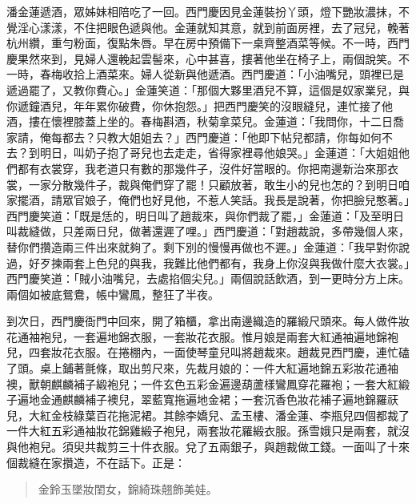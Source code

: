 潘金蓮遞酒，眾姊妹相陪吃了一回。西門慶因見金蓮裝扮丫頭，燈下艷妝濃抹，不覺淫心漾漾，不住把眼色遞與他。金蓮就知其意，就到前面房裡，去了冠兒，輓著杭州纘，重勻粉面，復點朱唇。早在房中預備下一桌齊整酒菜等候。不一時，西門慶果然來到，見婦人還輓起雲髻來，心中甚喜，摟著他坐在椅子上，兩個說笑。不一時，春梅收拾上酒菜來。婦人從新與他遞酒。西門慶道：「小油嘴兒，頭裡已是遞過罷了，又教你費心。」金蓮笑道：「那個大夥里酒兒不算，這個是奴家業兒，與你遞鐘酒兒，年年累你破費，你休抱怨。」把西門慶笑的沒眼縫兒，連忙接了他酒，摟在懷裡膝蓋上坐的。春梅斟酒，秋菊拿菜兒。金蓮道：「我問你，十二日喬家請，俺每都去？只教大姐姐去？」西門慶道：「他即下帖兒都請，你每如何不去？到明日，叫奶子抱了哥兒也去走走，省得家裡尋他娘哭。」金蓮道：「大姐姐他們都有衣裳穿，我老道只有數的那幾件子，沒件好當眼的。你把南邊新治來那衣裳，一家分散幾件子，裁與俺們穿了罷！只顧放著，敢生小的兒也怎的？到明日咱家擺酒，請眾官娘子，俺們也好見他，不惹人笑話。我長是說著，你把臉兒憨著。」西門慶笑道：「既是恁的，明日叫了趙裁來，與你們裁了罷，」金蓮道：「及至明日叫裁縫做，只差兩日兒，做著還遲了哩。」西門慶道：「對趙裁說，多帶幾個人來，替你們攢造兩三件出來就夠了。剩下別的慢慢再做也不遲。」金蓮道：「我早對你說過，好歹揀兩套上色兒的與我，我難比他們都有，我身上你沒與我做什麼大衣裳。」西門慶笑道：「賊小油嘴兒，去處掐個尖兒。」兩個說話飲酒，到一更時分方上床。兩個如被底鴛鴦，帳中鸞鳳，整狂了半夜。

到次日，西門慶衙門中回來，開了箱櫃，拿出南邊織造的羅緞尺頭來。每人做件妝花通袖袍兒，一套遍地錦衣服，一套妝花衣服。惟月娘是兩套大紅通袖遍地錦袍兒，四套妝花衣服。在捲棚內，一面使琴童兒叫將趙裁來。趙裁見西門慶，連忙磕了頭。桌上鋪著氈條，取出剪尺來，先裁月娘的：一件大紅遍地錦五彩妝花通袖襖，獸朝麒麟補子緞袍兒；一件玄色五彩金遍邊葫蘆樣鸞鳳穿花羅袍；一套大紅緞子遍地金通麒麟補子襖兒，翠藍寬拖遍地金裙；一套沉香色妝花補子遍地錦羅祆兒，大紅金枝綠葉百花拖泥裙。其餘李嬌兒、孟玉樓、潘金蓮、李瓶兒四個都裁了一件大紅五彩通袖妝花錦雞緞子袍兒，兩套妝花羅緞衣服。孫雪娥只是兩套，就沒與他袍兒。須臾共裁剪三十件衣服。兌了五兩銀子，與趙裁做工錢。一面叫了十來個裁縫在家攢造，不在話下。正是：
\begin{quote}
金鈴玉墜妝閨女，錦綺珠翹飾美娃。
\end{quote}
